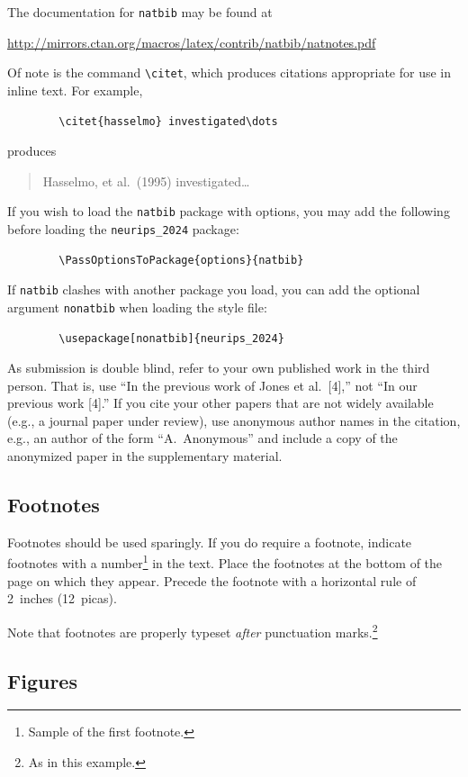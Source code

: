 \documentclass{article}
\begin{document}
	
	The documentation for \verb+natbib+ may be found at
	\begin{center}
		\url{http://mirrors.ctan.org/macros/latex/contrib/natbib/natnotes.pdf}
	\end{center}
	Of note is the command \verb+\citet+, which produces citations appropriate for
	use in inline text.  For example,
	\begin{verbatim}
		\citet{hasselmo} investigated\dots
	\end{verbatim}
	produces
	\begin{quote}
		Hasselmo, et al.\ (1995) investigated\dots
	\end{quote}
	
	
	If you wish to load the \verb+natbib+ package with options, you may add the
	following before loading the \verb+neurips_2024+ package:
	\begin{verbatim}
		\PassOptionsToPackage{options}{natbib}
	\end{verbatim}
	
	
	If \verb+natbib+ clashes with another package you load, you can add the optional
	argument \verb+nonatbib+ when loading the style file:
	\begin{verbatim}
		\usepackage[nonatbib]{neurips_2024}
	\end{verbatim}
	
	
	As submission is double blind, refer to your own published work in the third
	person. That is, use ``In the previous work of Jones et al.\ [4],'' not ``In our
	previous work [4].'' If you cite your other papers that are not widely available
	(e.g., a journal paper under review), use anonymous author names in the
	citation, e.g., an author of the form ``A.\ Anonymous'' and include a copy of the anonymized paper in the supplementary material.
	
	
	\subsection{Footnotes}
	
	
	Footnotes should be used sparingly.  If you do require a footnote, indicate
	footnotes with a number\footnote{Sample of the first footnote.} in the
	text. Place the footnotes at the bottom of the page on which they appear.
	Precede the footnote with a horizontal rule of 2~inches (12~picas).
	
	
	Note that footnotes are properly typeset \emph{after} punctuation
	marks.\footnote{As in this example.}
	
	
	\subsection{Figures}
	
\end{document}
